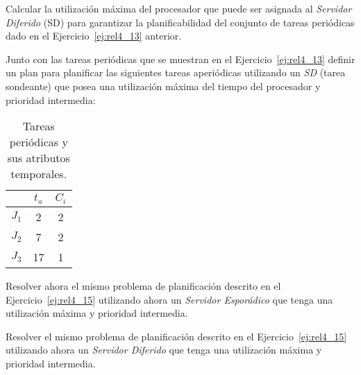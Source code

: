 \begin{ejercicio}\label{ej:rel4_14}
    Calcular la utilización máxima del procesador que puede ser asignada al \textit{Servidor Diferido} (SD) para garantizar la planificabilidad del conjunto de tareas periódicas dado en el Ejercicio~\ref{ej:rel4_13} anterior.
\end{ejercicio}

\begin{ejercicio}\label{ej:rel4_15}
    Junto con las tareas periódicas que se muestran en el Ejercicio~\ref{ej:rel4_13} definir un plan para planificar las siguientes tareas aperiódicas utilizando un \textit{SD} (tarea sondeante) que posea una utilización máxima del tiempo del procesador y prioridad intermedia:
    \begin{table}[H]
    \centering
    \begin{tabular}{|c|c|c|}
        \hline
        & $t_a$ & $C_i$ \\
        \hline
        $J_1$ & 2 & 2 \\
        \hline
        $J_2$ & 7 & 2 \\
        \hline
        $J_3$ & 17 & 1 \\
        \hline
    \end{tabular}
    \caption{Tareas periódicas y sus atributos temporales.}
    \label{tab:4_15}
    \end{table}
\end{ejercicio}

\begin{ejercicio}\label{ej:rel4_16}
    Resolver ahora el mismo problema de planificación descrito en el Ejercicio~\ref{ej:rel4_15} utilizando ahora un \textit{Servidor Esporádico} que tenga una utilización máxima y prioridad intermedia.
\end{ejercicio}

\begin{ejercicio}\label{ej:rel4_17}
    Resolver el mismo problema de planificación descrito en el Ejercicio~\ref{ej:rel4_15} utilizando ahora un \textit{Servidor Diferido} que tenga una utilización máxima y prioridad intermedia.
\end{ejercicio}

